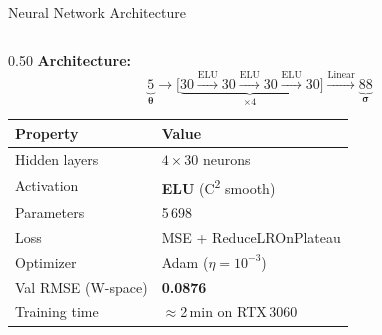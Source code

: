 \documentclass[aspectratio=169, 10pt]{beamer}
\begin{document}
\begin{frame}{Neural Network Architecture}
  \begin{columns}[T]
    \begin{column}{0.50\textwidth}
      \textbf{Architecture:}
      \[
        \underbrace{5}_{\boldsymbol\theta}
        \xrightarrow{\phantom{xx}}
        \bigl[\underbrace{30 \xrightarrow{\mathrm{ELU}} 30
                             \xrightarrow{\mathrm{ELU}} 30
                             \xrightarrow{\mathrm{ELU}} 30}_{\times 4}\bigr]
        \xrightarrow{\mathrm{Linear}}
        \underbrace{88}_{\boldsymbol\sigma}
      \]
      \vspace{0.2em}
      \begin{center}\small
      \begin{tabular}{@{}ll@{}}
        \toprule
        Property        & Value \\ \midrule
        Hidden layers   & $4 \times 30$ neurons \\
        Activation      & \textbf{ELU} (C\textsuperscript{2} smooth) \\
        Parameters      & 5\,698 \\
        Loss            & MSE + ReduceLROnPlateau \\
        Optimizer       & Adam ($\eta = 10^{-3}$) \\
        Val RMSE (W-space)   & \textbf{0.0876} \\
        Training time   & $\approx$2\,min on RTX\,3060 \\ \bottomrule
      \end{tabular}
      \end{center}
    \end{column}


\end{columns}
\end{frame}
\end{document}
